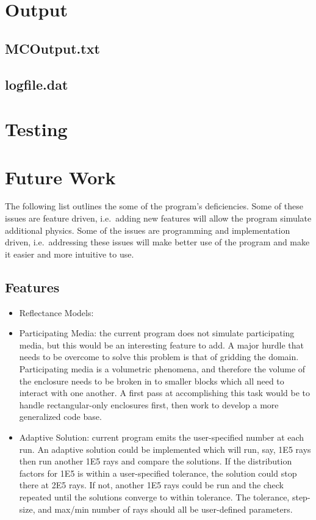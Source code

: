 \documentclass{article}
\begin{document}
\section{Output}
\label{sec:output}

\subsection{MCOutput.txt}

\subsection{logfile.dat}

\section{Testing}


\section{Future Work}
\label{sec:future work}

The following list outlines the some of the program's deficiencies. Some of these issues are feature driven, i.e.~adding new features will allow the program simulate additional physics. Some of the issues are programming and implementation driven, i.e.~addressing these issues will make better use of the program and make it easier and more intuitive to use.

\subsection{Features}

\begin{itemize}
	\item Reflectance Models:

	\item Participating Media: the current program does not simulate participating media, but this would be an interesting feature to add. A major hurdle that needs to be overcome to solve this problem is that of gridding the domain. Participating media is a volumetric phenomena, and therefore the volume of the enclosure needs to be broken in to smaller blocks which all need to interact with one another. A first pass at accomplishing this task would be to handle rectangular-only enclosures first, then work to develop a more generalized code base.

	\item Adaptive Solution: current program emits the user-specified number at each run. An adaptive solution could be implemented which will run, say, \SI{1E5}{} rays then run another \SI{1E5}{} rays and compare the solutions. If the distribution factors for \SI{1E5}{} is within a user-specified tolerance, the solution could stop there at \SI{2E5}{} rays. If not, another \SI{1E5}{} rays could be run and the check repeated until the solutions converge to within tolerance. The tolerance, step-size, and max/min number of rays should all be user-defined parameters.
\end{itemize}
\end{document}
